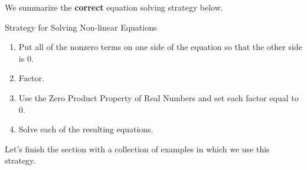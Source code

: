 We summarize the {\bf correct} equation solving strategy below.

\begin{floatbox}[label=box:solvenonlineareqns]{Strategy for Solving Non-linear Equations}

\begin{enumerate}[leftmargin=*]

\item  Put all of the nonzero terms on one side of the equation so that the other side is $0$.
\item  Factor.
\item  Use the Zero Product Property of Real Numbers and set each factor equal to $0$.
\item  Solve each of the resulting equations.

\end{enumerate}

\end{floatbox}

Let's finish the section with a collection of examples in which we use this strategy.

